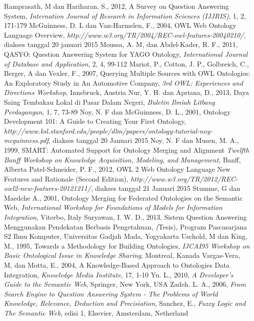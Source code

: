\begin{thebibliography}{99}
		Ramprasath, M dan Hariharan, S., 2012, A Survey on Question Answering System, \emph{Internation Journal of Research in Information Sciences (IJJRIS)}, 1, 2, 171-179
		McGuinness, D. L dan Van-Harmelen, F., 2004, OWL Web Ontology Language Overview, \emph{http://www.w3.org/TR/2004/REC-owl-features-20040210/}, diakses tanggal 20 januari 2015
		Moussa, A. M, dan Abdel-Kader, R. F., 2011, QASYO: Question Answering System for YAGO Ontology, \emph{International Journal of Database and Application}, 2, 4, 99-112
		Mariot, P., Cotton, J. P., Golbreich, C., Berger, A dan Vexler, F., 2007, Querying Multiple Sources with OWL Ontologies: An Exploratory Study in An Automotive Company, \emph{3rd OWL: Experiences and Directions Workshop}, Innsbruck, Austria
		Nur, Y. H. dan Apriana, D., 2013, Daya Saing Tembakau Lokal di Pasar Dalam Negeri, \emph{Buletin Ilmiah Litbang Perdagangan}, 1, 7, 73-89
		Noy, N. F dan McGuinness, D. L., 2001, Ontology Development 101: A Guide to Creating Your First Ontology, \emph{http://www.ksl.stanford.edu/people/dlm/papers/ontology-tutorial-noy-mcguinness.pdf}, diakses tanggal 20 Januari 2015
		Noy, N. F dan Musen, M. A., 1999, SMART: Automated Support for Ontology Merging and Alignment \emph{Twelfth Banff Workshop on Knowledge Acquisition, Modeling, and Management}, Banff, Alberta
		Patel-Schneider, P. F., 2012, OWL 2 Web Ontology Language New Features and Rationale (Second Edition), \emph{http://www.w3.org/TR/2012/REC-owl2-new-features-20121211/}, diakses tanggal 21 Januari 2015
		Stumme, G dan Maedche A., 2001, Ontology Merging for Federated Ontologies on the Semantic Web, \emph{ International Workshop for Foundations of Models for Information Integration}, Viterbo, Italy
		Suryawan, I. W. D., 2013, Sistem Question Answering Menggunakan Pendekatan Berbasis Pengetahuan, \emph(Tesis), Program Pascasarjana S2 Ilmu Komputer, Universitas Gadjah Mada, Yogyakarta
		Uschold, M dan King, M., 1995, Towards a Methodology for Building Ontologies, \emph{IJCAI95 Workshop on Basic Ontological Issue in Knowledge Sharing}, Montreal, Kanada
		Vargas-Vera, M, dan Motta, E., 2004, A Knowledge-Based Approach to Ontologies Data Integration, \emph{Knowledge Media Institute}, 17, 1-10
		Yu. L., 2010, \emph{A Developer's Guide to the Semantic Web}, Springer, New York, USA
		Zadeh. L. A., 2006, \emph{From Search Engine to Question Answering System - The Problems of World Knowledge, Relevance, Deduction and Precisiation}, Sanchez, E., \emph{Fuzzy Logic and The Semantic Web}, edisi 1, Elsevier, Amsterdam, Netherland
\end{thebibliography}